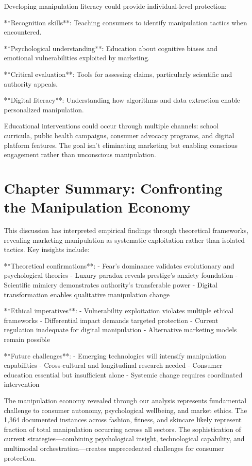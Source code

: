 Developing manipulation literacy could provide individual-level protection:

**Recognition skills**: Teaching consumers to identify manipulation tactics when encountered.

**Psychological understanding**: Education about cognitive biases and emotional vulnerabilities exploited by marketing.

**Critical evaluation**: Tools for assessing claims, particularly scientific and authority appeals.

**Digital literacy**: Understanding how algorithms and data extraction enable personalized manipulation.

Educational interventions could occur through multiple channels: school curricula, public health campaigns, consumer advocacy programs, and digital platform features. The goal isn't eliminating marketing but enabling conscious engagement rather than unconscious manipulation.

\section{Chapter Summary: Confronting the Manipulation Economy}
\label{sec:discussion_summary}

This discussion has interpreted empirical findings through theoretical frameworks, revealing marketing manipulation as systematic exploitation rather than isolated tactics. Key insights include:

**Theoretical confirmations**:
- Fear's dominance validates evolutionary and psychological theories
- Luxury paradox reveals prestige's anxiety foundation
- Scientific mimicry demonstrates authority's transferable power
- Digital transformation enables qualitative manipulation change

**Ethical imperatives**:
- Vulnerability exploitation violates multiple ethical frameworks
- Differential impact demands targeted protection
- Current regulation inadequate for digital manipulation
- Alternative marketing models remain possible

**Future challenges**:
- Emerging technologies will intensify manipulation capabilities
- Cross-cultural and longitudinal research needed
- Consumer education essential but insufficient alone
- Systemic change requires coordinated intervention

The manipulation economy revealed through our analysis represents fundamental challenge to consumer autonomy, psychological wellbeing, and market ethics. The 1,364 documented instances across fashion, fitness, and skincare likely represent fraction of total manipulation occurring across all sectors. The sophistication of current strategies—combining psychological insight, technological capability, and multimodal orchestration—creates unprecedented challenges for consumer protection.

